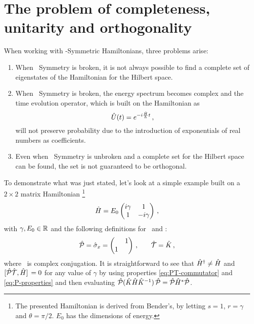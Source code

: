     \section{The problem of completeness, unitarity and orthogonality}\label{s:problem}
        When working with \PT-Symmetric Hamiltonians, three problems arise:
        \begin{enumerate}[label = \mybullet]
            \item When \PT\ Symmetry is broken, it is not always possible to find a complete set of eigenstates of the Hamiltonian for the Hilbert space.
            \item When \PT\ Symmetry is broken, the energy spectrum becomes complex and the time evolution operator, which is built on the Hamiltonian as 
            \begin{equation}
                \label{eq:time-evolution}
                \hU\pqty{t} = \myexp{-i\frac{\hH}{\hbar}t}
                \mycomma
            \end{equation}
            will not preserve probability due to the introduction of exponentials of real numbers as coefficients.
            \item Even when \PT\ Symmetry is unbroken and a complete set for the Hilbert space can be found, the set is not guaranteed to be orthogonal.
        \end{enumerate}
        To demonstrate what was just stated, let's look at a simple example built on a $2\times2$ matrix Hamiltonian \cite{Bender2005,Bender2007}\footnote{The presented Hamiltonian is derived from Bender's, by letting $s = 1$, $r = \gamma$ and $\theta = \pi/2$. $E_0$ has the dimensions of energy.}
        \begin{equation}
            \label{eq:ex:reduced-2x2-hamiltonian}
            \hH = E_0 \pmqty{\dmat[1]{i\gamma, -i\gamma}}
            \mycomma
        \end{equation}
        with $\gamma,E_0\in\mathbb{R}$ and the following definitions for \hP\ and \hT :
        \begin{equation}
            \label{eq:ex:reduced-2x2-P-T}
            \hP = \hat{\sigma}_x = \pmqty{\admat{1,1}}
            \mycomma\qquad
            \hT = \hK
            \mycomma
        \end{equation}
        where \hK\ is complex conjugation. It is straightforward to see that $\hat{H}^\dag \neq \hat{H}$ and $\comm*{\hPT}{\hH} = 0$ for any value of $\gamma$ by using properties \eqref{eq:PT-commutator} and \eqref{eq:P-properties} and then evaluating $\hP\pqty*{\hK\hH\hK^{-1}}\hP = \hP\hH^*\hP$.
        
